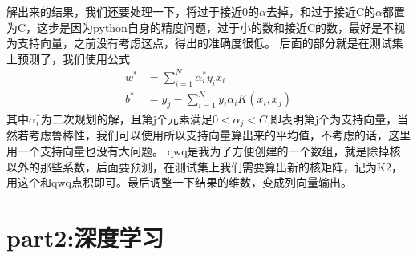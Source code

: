 \documentclass{report}
\begin{document}
    解出来的结果，我们还要处理一下，将过于接近0的$\alpha$去掉，和过于接近C的$\alpha$都置为C，这步是因为python自身的精度问题，过于小的数和接近C的数，最好是不视为支持向量，之前没有考虑这点，得出的准确度很低。
    后面的部分就是在测试集上预测了，我们使用公式
    \begin{align}
        w^*&=\sum_{i=1}^N\alpha^*_iy_ix_i\\
        b^*&=y_j-\sum_{i=1}^Ny_i\alpha_iK(x_i,x_j)
    \end{align}
    其中$\alpha^*_i$为二次规划的解，且第j个元素满足$0< \alpha_j < C$,即表明第j个为支持向量，当然若考虑鲁棒性，我们可以使用所以支持向量算出来的平均值，不考虑的话，这里用一个支持向量也没有大问题。
    qwq是我为了方便创建的一个数组，就是除掉核以外的那些系数，后面要预测，在测试集上我们需要算出新的核矩阵，记为K2，用这个和qwq点积即可。最后调整一下结果的维数，变成列向量输出。
    \section{part2:深度学习}
\end{document}
